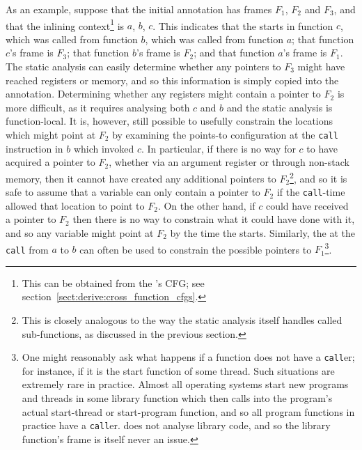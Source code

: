 As an example, suppose that the initial  annotation
has frames $F_1$, $F_2$ and $F_3$, and that the inlining
context\footnote{This can be obtained from the {\StateMachine}'s CFG;
  see section~\ref{sect:derive:cross_function_cfgs}.} is $a$, $b$,
$c$.  This indicates that the {\StateMachine} starts in function $c$,
which was called from function $b$, which was called from function
$a$; that function $c$'s frame is $F_3$; that function $b$'s frame is
$F_2$; and that function $a$'s frame is $F_1$.  The static analysis
can easily determine whether any pointers to $F_3$ might have reached
registers or memory, and so this information is simply copied into the
 annotation.  Determining whether any registers
might contain a pointer to $F_2$ is more difficult, as it requires
analysing both $c$ and $b$ and the static analysis is function-local.
It is, however, still possible to usefully constrain the locations
which might point at $F_2$ by examining the points-to configuration at
the \texttt{call} instruction in $b$ which invoked $c$.  In
particular, if there is no way for $c$ to have acquired a pointer to
$F_2$, whether via an argument register or through non-stack memory,
then it cannot have created any additional pointers to
$F_2$\footnote{This is closely analogous to the way the static
  analysis itself handles called sub-functions, as discussed in the
  previous section.}, and so it is safe to assume that a variable can
only contain a pointer to $F_2$ if the \texttt{call}-time
 allowed that location to point to
$F_2$.  On the other hand, if $c$ could have
received a pointer to $F_2$ then there is no way to constrain what it
could have done with it, and so any variable might point at $F_2$ by
the time the {\StateMachine} starts.  Similarly, the
 at the \texttt{call} from $a$ to $b$
can often be used to constrain the possible pointers to
$F_1$\footnote{One might reasonably ask what happens if a function
  does not have a \texttt{call}er; for instance, if it is the start
  function of some thread.  Such situations are extremely rare in
  practice.  Almost all operating systems start new programs and
  threads in some library function which then calls into the program's
  actual start-thread or start-program function, and so all program
  functions in practice have a \texttt{call}er.  {\Implementation}
  does not analyse library code, and so the library function's frame
  is itself never an issue.}.

